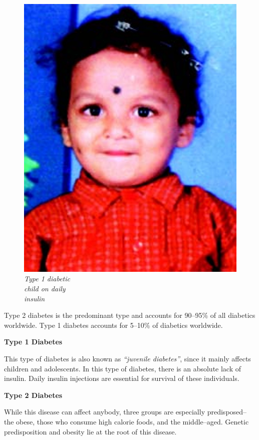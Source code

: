 \begin{figure}
\includegraphics{images/024.jpg}
\caption{\textit{Type 1 diabetic\\ child on daily\\ insulin}}
\end{figure}

Type 2 diabetes is the predominant type and accounts for 90–95\% of all diabetics worldwide. Type 1 diabetes accounts for 5–10\% of diabetics worldwide.

\textbf{Type 1 Diabetes}

This type of diabetes is also known as \textit{“juvenile diabetes”}, since it mainly affects children and adolescents. In this type of diabetes, there is an absolute lack of insulin. Daily insulin injections are essential for survival of these individuals.

\textbf{Type 2 Diabetes}

While this disease can affect anybody, three groups are especially predisposed– the obese, those who consume high calorie foods, and the middle–aged. Genetic predisposition and obesity lie at the root of this disease.

